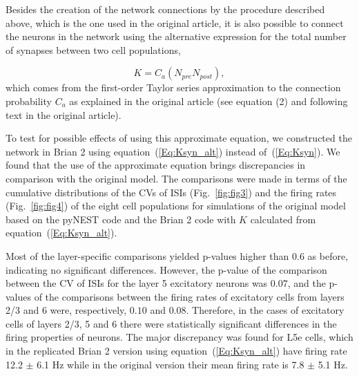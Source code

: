 \documentclass[10pt,a4paper,onecolumn]{article}
\begin{document}
Besides the creation of the network connections by the procedure described above, which is the one used in the original article, it is also possible to connect the neurons in the network using the alternative expression for the total number of synapses between two cell populations,

\begin{equation}
\label{Eq:Ksyn_alt}
K = C_a(N_{pre}N_{post}),
\end{equation}
\noindent which comes from the first-order Taylor series approximation to the connection probability $C_{a}$ as explained in the original article (see equation (2) and following text in the original article). 

%
To test for possible effects of using this approximate equation, we constructed the network in Brian 2 using equation~(\ref{Eq:Ksyn_alt}) instead of~(\ref{Eq:Ksyn}). We found that the use of the approximate equation brings discrepancies in comparison with the original model. The comparisons were made in terms of the cumulative distributions of the CVs of ISIs (Fig.~\ref{fig:fig3}) and the firing rates (Fig.~\ref{fig:fig4}) of the eight cell populations for simulations of the original model based on the pyNEST code \cite{potjans2014pyNEST} and the Brian 2 code with $K$ calculated from equation~(\ref{Eq:Ksyn_alt}). 

Most of the layer-specific comparisons yielded p-values higher than 0.6 as before, indicating no significant differences. However, the p-value of the comparison between the CV of ISIs for the layer 5 excitatory neurons was $0.07$, and the p-values of the comparisons between the firing rates of excitatory cells from layers 2/3 and 6 were, respectively, $0.10$ and $0.08$. Therefore, in the cases of excitatory cells of layers 2/3, 5 and 6 there were statistically significant differences in the firing properties of neurons. The major discrepancy was found for L5e cells, which in the replicated Brian 2 version using equation~(\ref{Eq:Ksyn_alt}) have firing rate 12.2 $\pm$ 6.1 Hz while in the original version their mean firing rate is 7.8 $\pm$ 5.1 Hz.
\end{document}
